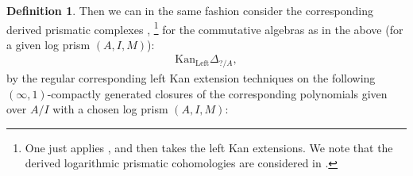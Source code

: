 \documentclass[11pt]{book}
\theoremstyle{definition}
\newtheorem{definition}[theorem]{Definition}
\numberwithin{equation}{section}
\begin{document}
\begin{definition}
Then we can in the same fashion consider the corresponding derived prismatic complexes \cite[Construction 7.6]{12BS}, \cite[Definition 4.1]{12Ko1}\footnote{One just applies \cite[Construction 7.6]{12BS}, \cite[Definition 4.1]{12Ko1} and then takes the left Kan extensions. We note that the derived logarithmic prismatic cohomologies are considered in \cite[Just above Notation in Section 1]{12Ko1}.} for the commutative algebras as in the above (for a given log prism $(A,I,M)$):
\begin{align}
\mathrm{Kan}_{\mathrm{Left}}\Delta_{?/A},	
\end{align}
by the regular corresponding left Kan extension techniques on the following $(\infty,1)$-compactly generated closures of the corresponding polynomials given over $A/I$ with a chosen log prism $(A,I,M)$:



\end{definition}
\end{document}
